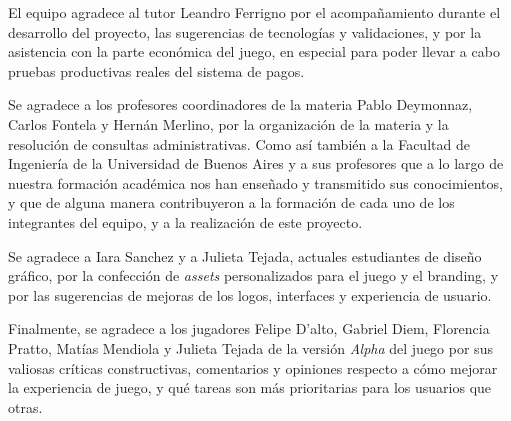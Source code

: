 El equipo agradece al tutor Leandro Ferrigno por el acompañamiento durante el desarrollo del proyecto, las sugerencias de 
tecnologías y validaciones, y por la asistencia con la parte económica del juego, en especial para poder llevar a cabo 
pruebas productivas reales del sistema de pagos.

Se agradece a los profesores coordinadores de la materia Pablo Deymonnaz, Carlos Fontela y Hernán Merlino, por 
la organización de la materia y la resolución de consultas administrativas. Como así también a la Facultad de Ingeniería
de la Universidad de Buenos Aires y a sus profesores
que a lo largo de nuestra formación académica nos han enseñado y transmitido sus conocimientos, y que de alguna manera 
contribuyeron a la formación de cada uno de los integrantes del equipo, y a la realización de este proyecto.

Se agradece a Iara Sanchez y a Julieta Tejada, actuales estudiantes de diseño gráfico, por la confección de \textit{assets} 
personalizados para el juego y el branding, y por las sugerencias de mejoras de los logos, interfaces y experiencia de usuario.

Finalmente, se agradece a los jugadores Felipe D'alto, Gabriel Diem, Florencia Pratto, Matías Mendiola y Julieta Tejada de 
la versión \textit{Alpha} del juego por sus valiosas críticas constructivas, comentarios y opiniones respecto a cómo
mejorar la experiencia de juego, y qué tareas son más prioritarias para los usuarios que otras.
